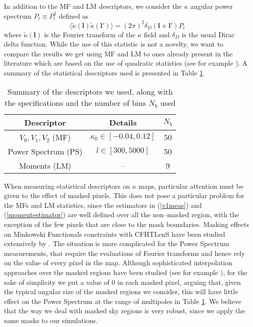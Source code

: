 \documentclass[reprint,aps,prd,superscriptaddress,showkeys,showpacs]{revtex4-1}
\begin{document}
In addition to the MF and LM descriptors, we consider the $\kappa$ angular power spectrum $P_l\equiv P^2_l$ defined as
\begin{equation}
\label{powerspectrum}
\langle\tilde{\kappa}(\mathbf{l})\tilde{\kappa}(\mathbf{l}')\rangle=(2\pi)^2\delta_D(\mathbf{l}+\mathbf{l}')P_l
\end{equation}  
%
%
where $\tilde{\kappa}(\mathbf{l})$ is the Fourier transform of the $\kappa$ field and $\delta_D$ is the usual Dirac delta function. While the use of this statistic is not a novelty, we want to compare the results we get using MF and LM to ones already present in the literature which are based on the use of quadratic statistics (see for example \citep{CFHTKilbinger}). A summary of the statistical descriptors used is presented in Table \ref{desctable}. 
%
\begin{table}
\begin{tabular}{c|c|c} \hline
Descriptor & Details & $N_b$ \\ \hline
$V_0,V_1,V_2$ (MF) & $\kappa_0\in[-0.04,0.12]$ & 50 \\
Power Spectrum (PS) & $l \in [300,5000]$ & 50 \\
Moments (LM) & -- & 9 \\
\end{tabular}
\caption{Summary of the descriptors we used, along with the specifications and the number of bins $N_b$ used}
\label{desctable}
\end{table}
%


When measuring statistical descriptors on $\kappa$ maps, particular attention must be given to the effect of masked pixels. This does not pose a particular problem for the MFs and LM statistics, since the estimators in (\ref{v1meas}) and (\ref{momentestimator}) are well defined over all the non--masked region, with the exception of the few pixels that are close to the mask boundaries. Masking effects on Minkowski Functionals constraints with CFHTLenS have been studied extensively by \citep{CFHTMasato}. The situation is more complicated for the Power Spectrum measurements, that require the evaluations of Fourier transforms and hence rely on the value of every pixel in the map. Although sophisticated interpolation approaches over the masked regions have been studied (see for example \citep{VplasInterpolation}), for the sake of simplicity we put a value of 0 in each masked pixel, arguing that, given the typical angular size of the masked regions we consider, this will have little effect on the Power Spectrum at the range of multipoles in Table \ref{desctable}. We believe that the way we deal with masked sky regions is very robust, since we apply the same masks to our simulations. 
\end{document}
